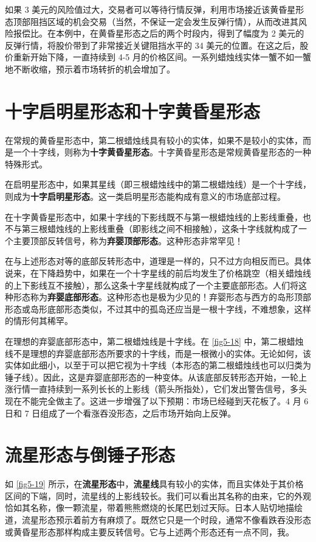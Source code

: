 如果 3 美元的风险值过大，交易者可以等待行情反弹，利用市场接近该黄昏星形态顶部阻挡区域的机会交易（当然，不保证一定会发生反弹行情），从而改进其风险报偿比。在本例中，在黄昏星形态之后的两个时段内，得到了幅度为 2 美元的反弹行情，将股价带到了非常接近关键阻挡水平的 34 美元的位置。在这之后，股价重新开始下降，一直持续到 4-5 月的价格区间。一系列蜡烛线实体一蟹不如一蟹地不断收缩，预示着市场转折的机会增加了。


\section{十字启明星形态和十字黄昏星形态}
在常规的黄昏星形态中，第二根蜡烛线具有较小的实体，如果不是较小的实体，而是一个十字线，则称为\textbf{十字黄昏星形态}。十字黄昏星形态是常规黄昏星形态的一种特殊形式。

在启明星形态中，如果其星线（即三根蜡烛线中的第二根蜡烛线）是一个十字线，则成为\textbf{十字启明星形态}。这一类启明星形态能构成有意义的市场底部过程。


在十字黄昏星形态中，如果十字线的下影线既不与第一根蜡烛线的上影线重叠，也不与第三根蜡烛线的上影线重叠（即影线之间不相接触），这条十字线就构成了一个主要顶部反转信号，称为\textbf{弃婴顶部形态}。这种形态非常罕见！

在与上述形态对等的底部反转形态中，道理是一样的，只不过方向相反而已。具体说来，在下降趋势中，如果在一个十字星线的前后均发生了价格跳空（相关蜡烛线的上下影线互不接触），那么这条十字星线就构成了一个主要底部形态。人们将这种形态称为\textbf{弃婴底部形态}。这种形态也是极为少见的！弃婴形态与西方的岛形顶部形态或岛形底部形态类似，不过其中的孤岛还应当是一根十字线，不难想象，这样的情形何其稀罕。

在理想的弃婴底部形态中，第二根蜡烛线是十字线。在 \autoref{fig5-18} 中，第二根蜡烛线不是理想的弃婴底部形态所要求的十字线，而是一根微小的实体。无论如何，该实体如此细小，以至于可以把它视为十字线（本形态的第二根蜡烛线也可以归类为锤子线）。因此，这是弃婴底部形态的一种变体。从该底部反转形态开始，一轮上涨行情一直持续到一系列长长的上影线（箭头所指处），它们发出警告信号，多头现在不能完全做主了。这进一步增强了以下预期：市场已经碰到天花板了。4 月 6 日和 7 日组成了一个看涨吞没形态，之后市场开始向上反弹。

\section{流星形态与倒锤子形态}
如 \autoref{fig5-19} 所示，在\textbf{流星形态}中，\textbf{流星线}具有较小的实体，而且实体处于其价格区间的下端，同时，流星线的上影线较长。我们可以看出其名称的由来，它的外观恰如其名称，像一颗流星，带着熊熊燃烧的长尾巴划过天际。日本人贴切地描绘道，流星形态预示着前方有麻烦了。既然它只是一个时段，通常不像看跌吞没形态或黄昏星形态那样构成主要反转信号。它与上述两个形态还有一点不同，我。

